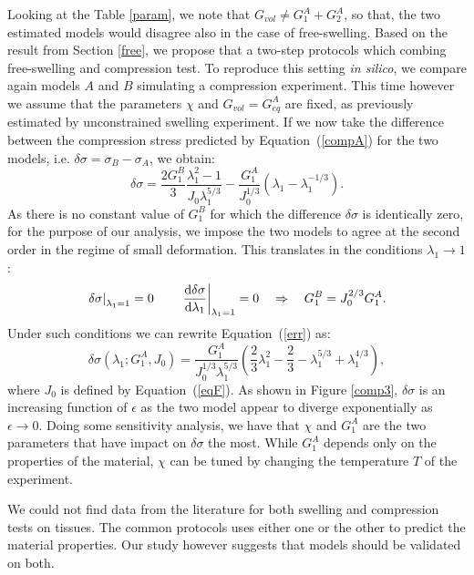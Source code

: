 Looking at the Table  \ref{param}, we note that $G_{vol}\neq G^A_{1}+G^A_2$, so that, the two estimated models would disagree also in the case of free-swelling. Based on the result from Section \ref{free}, we propose that a two-step protocols which combing free-swelling and compression test. To reproduce this setting \textit{in silico}, we compare again models $A$ and $B$ simulating a compression experiment. This time however we assume that the parameters $\chi$ and $G_{vol}=G^A_{eq}$ are fixed, as previously estimated by unconstrained swelling experiment. If we now take the difference between the compression stress predicted by Equation~(\ref{compA}) for the two models, i.e. $\delta \sigma= \sigma_{B}-\sigma_{A}$, we obtain:
\begin{equation}
\delta \sigma = \frac{2 G_1^{B}}{3} \frac{\lambda_1^2-1}{J_0\lambda_1^{5/3}} - \frac{G_1^A}{J_0^{1/3}}(\lambda_1-\lambda_1^{-1/3}).\label{err}
\end{equation}
As there is no constant value of $G^{B}_1$ for which the difference $\delta \sigma$ is identically zero, for the purpose of our analysis, we impose the two models to agree at the second order in the regime of small deformation. This translates in the conditions $\lambda_1\rightarrow 1$:
\begin{equation}
\left.\delta \sigma\right|_{\lambda_1=1}=0 \qquad \left.\frac{\text{d} \delta \sigma}{\text{d} \lambda_1}\right|_{\lambda_1=1}=0 \quad\Rightarrow \quad G_1^{B} = J_0^{2/3}G_1^A.
\end{equation}
Under such conditions we can rewrite Equation~(\ref{err}) as:
\begin{equation}
\delta \sigma(\lambda_1;G^A_1,J_0) = \frac{G_1^A}{J^{1/3}_0\lambda_1^{5/3}} \left(\frac{2}{3}\lambda^2_1-\frac{2}{3}-\lambda_1^{5/3}+\lambda_1^{4/3}\right), 
\end{equation}
where $J_0$ is defined by Equation~(\ref{eqF}). As shown in Figure \ref{comp3}, $\delta \sigma$ is an increasing function of $\epsilon$ as the two model appear to diverge exponentially as $\epsilon \rightarrow 0 $. Doing some sensitivity analysis, we have that $\chi$ and $G_1^A$ are the two parameters that have impact on $\delta\sigma$ the most. While $G_1^A$ depends only on the properties of the material, $\chi$ can be tuned by changing the temperature $T$ of the experiment. 

We could not find data from the literature for both swelling and compression tests on tissues. The common protocols uses either one or the other to predict the material properties. Our study however suggests that models should be validated on both. 
